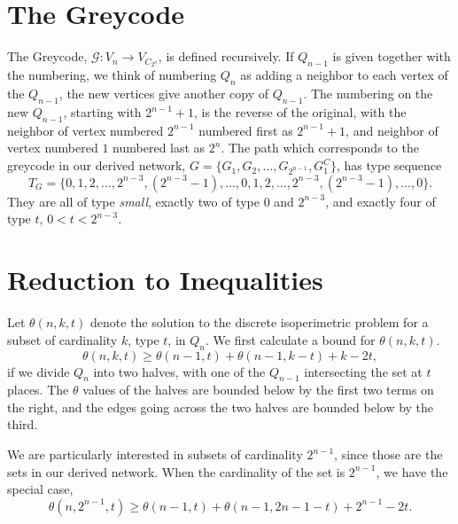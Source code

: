 \documentclass[12pt]{ucthesis}
\theoremstyle{plain}
\theoremstyle{definition}
\begin{document}
\section{The Greycode}
\label{Section 2.6}

The Greycode, $\mathcal{G} \colon V_n \rightarrow V_{C_{2^n}}$,
is defined recursively.
If $Q_{n - 1}$ is given together with the numbering,
we think of numbering $Q_n$ as adding a neighbor to each vertex of the $Q_{n - 1}$,
the new vertices give another copy of $Q_{n - 1}$.
The numbering on the new $Q_{n - 1}$, starting with $2^{n - 1} + 1$,
is the reverse of the original,
with the neighbor of vertex numbered $2^{n - 1}$ numbered first as $2^{n - 1} + 1$,
and neighbor of vertex numbered $1$ numbered last as $2^n$.
The path which corresponds to the greycode in our derived network,
$G = \{G_1, G_2, \dots, G_{2^{n - 1}}, G_1^C\}$, has type sequence
\begin{equation*}
T_G = \{0, 1, 2, \dots, 2^{n - 3}, (2^{n - 3} - 1), \dots, 0, 1, 2, \dots, 2^{n - 3}, (2^{n - 3} - 1), \dots, 0\}.
\end{equation*}
They are all of type \emph{small}, exactly two of type $0$ and $2^{n - 3}$,
and exactly four of type $t$, $0 < t < 2^{n - 3}$.

\section{Reduction to Inequalities}
\label{Section 2.7}

Let $\theta(n, k, t)$ denote the solution to the discrete isoperimetric problem
for a subset of cardinality $k$, type $t$, in $Q_n$.
We first calculate a bound for $\theta(n, k, t)$.
\begin{equation}
\label{Equation 2.1}
\theta(n, k, t) \ge \theta(n - 1, t) + \theta(n - 1, k - t) + k - 2 t,
\end{equation}
if we divide $Q_n$ into two halves,
with one of the $Q_{n - 1}$ intersecting the set at $t$ places.
The $\theta$ values of the halves are bounded below by the first two terms on the right,
and the edges going across the two halves are bounded below by the third.

We are particularly interested in subsets of cardinality $2^{n - 1}$,
since those are the sets in our derived network.
When the cardinality of the set is $2^{n - 1}$, we have the special case,
\begin{equation}
\label{Equation 2.2}
\theta(n, 2^{n - 1}, t) \ge \theta(n - 1, t) + \theta(n - 1, 2{n - 1} - t) + 2^{n - 1} - 2 t.
\end{equation}
\end{document}
